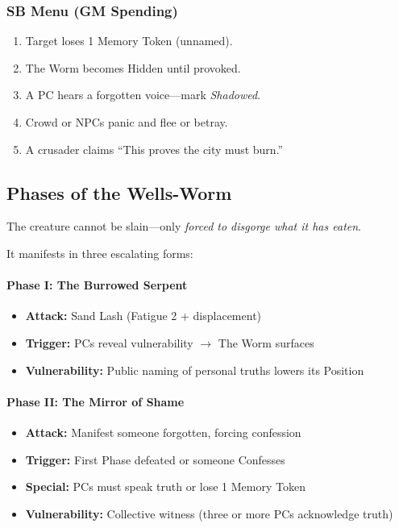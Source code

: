 \documentclass[11pt]{article}
\begin{document}
\begin{creature}
    \vspace{6pt}
    
    \subsubsection*{SB Menu (GM Spending)}
    \begin{enumerate}
      \item Target loses 1 Memory Token (unnamed).
      \item The Worm becomes Hidden until provoked.
      \item A PC hears a forgotten voice---mark \emph{Shadowed}.
      \item Crowd or NPCs panic and flee or betray.
      \item A crusader claims ``This proves the city must burn.''
    \end{enumerate}
    
    \vspace{6pt}
    
    \subsection*{Phases of the Wells-Worm}
    The creature cannot be slain---only \emph{forced to disgorge what it has eaten}.
    
    It manifests in three escalating forms:
    
    \paragraph{Phase I: The Burrowed Serpent}
    \begin{itemize}
      \item \textbf{Attack:} Sand Lash (Fatigue 2 + displacement)
      \item \textbf{Trigger:} PCs reveal vulnerability $\rightarrow$ The Worm surfaces
      \item \textbf{Vulnerability:} Public naming of personal truths lowers its Position
    \end{itemize}
    
    \paragraph{Phase II: The Mirror of Shame}
    \begin{itemize}
      \item \textbf{Attack:} Manifest someone forgotten, forcing confession
      \item \textbf{Trigger:} First Phase defeated or someone Confesses
      \item \textbf{Special:} PCs must speak truth or lose 1 Memory Token
      \item \textbf{Vulnerability:} Collective witness (three or more PCs acknowledge truth)
    \end{itemize}
    

\end{creature}
\end{document}
